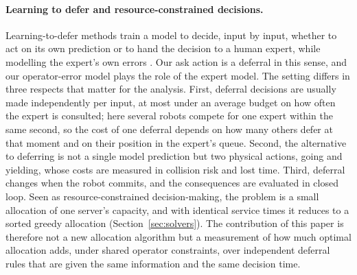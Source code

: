 \documentclass[a4paper,fleqn]{cas-dc}
\begin{document}
\paragraph{Learning to defer and resource-constrained decisions.}
Learning-to-defer methods train a model to decide, input by input, whether to act on its own prediction or to hand the decision to a human expert, while modelling the expert's own errors \citep{Madras2018,MozannarSontag2020}. Our ask action is a deferral in this sense, and our operator-error model plays the role of the expert model. The setting differs in three respects that matter for the analysis. First, deferral decisions are usually made independently per input, at most under an average budget on how often the expert is consulted; here several robots compete for one expert within the same second, so the cost of one deferral depends on how many others defer at that moment and on their position in the expert's queue. Second, the alternative to deferring is not a single model prediction but two physical actions, going and yielding, whose costs are measured in collision risk and lost time. Third, deferral changes when the robot commits, and the consequences are evaluated in closed loop. Seen as resource-constrained decision-making, the problem is a small allocation of one server's capacity, and with identical service times it reduces to a sorted greedy allocation (Section~\ref{sec:solvers}). The contribution of this paper is therefore not a new allocation algorithm but a measurement of how much optimal allocation adds, under shared operator constraints, over independent deferral rules that are given the same information and the same decision time.
\end{document}
